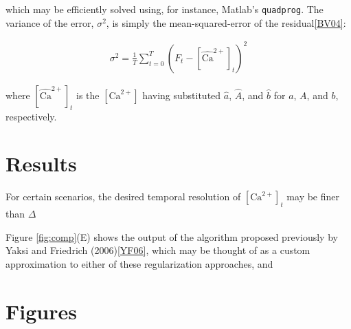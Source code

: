 \documentclass[12pt]{article}
\newcommand{\Ca}{[\text{Ca}^{2+}]}
\newcommand{\Cae}{[\widehat{\text{Ca}}^{2+}]}
\begin{document}
\noindent which may be efficiently solved using, for instance, Matlab's \texttt{quadprog}. The variance of the error, $\sigma^2$, is simply the mean-squared-error of the residual\ref{BV04}:

\begin{align}
\sigma^2 = \frac{1}{T} \sum_{t=0}^T (F_t - \Cae_t)^2
\end{align}

\noindent where $\Cae_t$ is the $\Ca$ having substituted $\widehat{a}$, $\widehat{A}$, and $\widehat{b}$ for $a$, $A$, and $b$, respectively.

\section{Results} \label{sec:results}

For certain scenarios, the desired temporal resolution of $\Ca_t$ may be finer than $\Delta$

Figure \ref{fig:comp}(E) shows the output of the algorithm proposed previously by Yaksi and Friedrich (2006)\ref{YF06}, which may be thought of as a custom approximation to either of these regularization approaches, and










\clearpage
\section{Figures}
\end{document}
